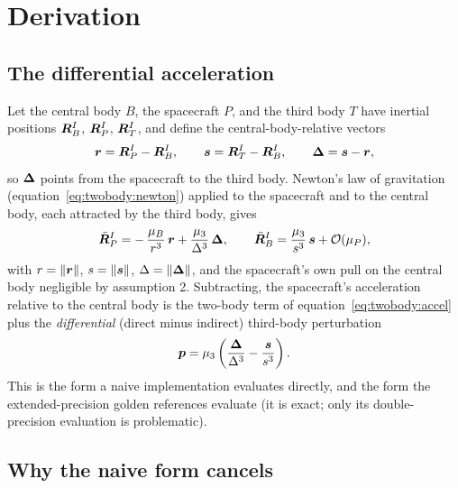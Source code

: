 \section{Derivation}
\label{sec:thirdbody:derivation}

\subsection{The differential acceleration}

Let the central body $B$, the spacecraft $P$, and the third body $T$ have
inertial positions $\bm{R}_B^{I}$, $\bm{R}_P^{I}$, $\bm{R}_T^{I}$, and
define the central-body-relative vectors
\begin{equation}
  \bm{r} = \bm{R}_P^{I} - \bm{R}_B^{I},
  \qquad
  \bm{s} = \bm{R}_T^{I} - \bm{R}_B^{I},
  \qquad
  \bm{\Delta} = \bm{s} - \bm{r},
  \label{eq:thirdbody:vectors}
\end{equation}
so $\bm{\Delta}$ points from the spacecraft to the third body. Newton's
law of gravitation (equation~\eqref{eq:twobody:newton}) applied to the
spacecraft and to the central body, each attracted by the third body,
gives
\begin{equation}
  \ddot{\bm{R}}_P^{I}
    = -\,\frac{\mu_B}{r^{3}}\,\bm{r}
      + \frac{\mu_3}{\Delta^{3}}\,\bm{\Delta},
  \qquad
  \ddot{\bm{R}}_B^{I}
    = \frac{\mu_3}{s^{3}}\,\bm{s}
      + \mathcal{O}(\mu_P),
  \label{eq:thirdbody:eom}
\end{equation}
with $r = \left\lVert \bm{r} \right\rVert$, $s = \left\lVert \bm{s} \right\rVert$, $\Delta =
\left\lVert \bm{\Delta} \right\rVert$, and the spacecraft's own pull on the central body
negligible by assumption 2. Subtracting, the spacecraft's acceleration
relative to the central body is the two-body term of
equation~\eqref{eq:twobody:accel} plus the \emph{differential} (direct
minus indirect) third-body perturbation
\begin{equation}
  \bm{p} = \mu_3 \left( \frac{\bm{\Delta}}{\Delta^{3}}
           - \frac{\bm{s}}{s^{3}} \right).
  \label{eq:thirdbody:naive}
\end{equation}
This is the form a naive implementation evaluates directly, and the form
the extended-precision golden references evaluate (it is exact; only its
double-precision evaluation is problematic).

\subsection{Why the naive form cancels}


